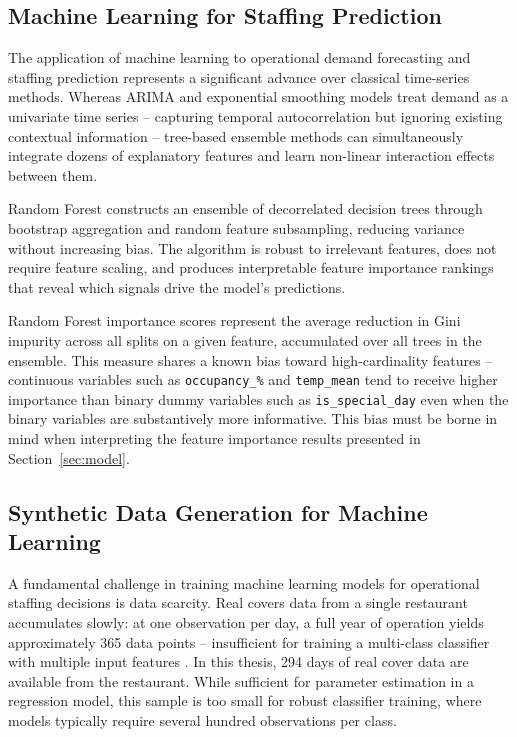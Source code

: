 \documentclass[12pt,a4paper,oneside]{article}
\begin{document}
\subsection{Machine Learning for Staffing Prediction}

The application of machine learning to operational demand forecasting and staffing prediction represents a significant advance over classical time-series methods. Whereas ARIMA and exponential smoothing models treat demand as a univariate time series -- capturing temporal autocorrelation but ignoring existing contextual information -- tree-based ensemble methods can simultaneously integrate dozens of explanatory features and learn non-linear interaction effects between them.

Random Forest \citep{breiman2001} constructs an ensemble of decorrelated decision trees through bootstrap aggregation and random feature subsampling, reducing variance without increasing bias. The algorithm is robust to irrelevant features, does not require feature scaling, and produces interpretable feature importance rankings that reveal which signals drive the model's predictions.

Random Forest importance scores represent the average reduction in Gini impurity across all splits on a given feature, accumulated over all trees in the ensemble. This measure shares a known bias toward high-cardinality features \citep{strobl2007} -- continuous variables such as \texttt{occupancy\_\%} and \texttt{temp\_mean} tend to receive higher importance than binary dummy variables such as \texttt{is\_special\_day} even when the binary variables are substantively more informative. This bias must be borne in mind when interpreting the feature importance results presented in Section~\ref{sec:model}.

\subsection{Synthetic Data Generation for Machine Learning}

A fundamental challenge in training machine learning models for operational staffing decisions is data scarcity. Real covers data from a single restaurant accumulates slowly: at one observation per day, a full year of operation yields approximately 365 data points -- insufficient for training a multi-class classifier with multiple input features \citep{lu2023}. In this thesis, 294 days of real cover data are available from the restaurant. While sufficient for parameter estimation in a regression model, this sample is too small for robust classifier training, where models typically require several hundred observations per class.
\end{document}
